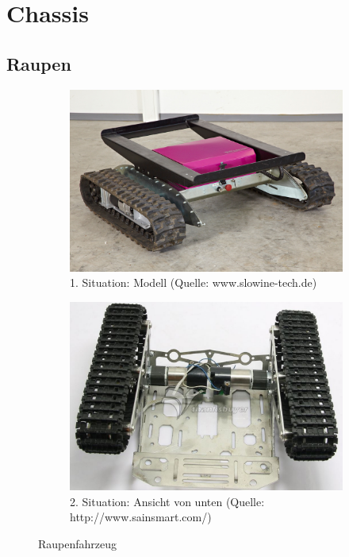 
\section{Chassis}


\subsection{Raupen}

\begin{figure} [hbp]
	\centering
	\begin{subfigure}[b]{0.4\textwidth}
		\includegraphics[width=\textwidth]{fig/Raupenfahrzeug.jpg}
		\caption{1. Situation: Modell 
		(Quelle: www.slowine-tech.de)}
	\end{subfigure}
	\hfill
	\begin{subfigure}[b]{0.36\textwidth}
		\includegraphics[width=\textwidth]{fig/Raupenfahrzeug-2.JPG}
		\caption{2. Situation: Ansicht von unten
		(Quelle: http://www.sainsmart.com/)}
\end{subfigure}
	\caption{Raupenfahrzeug}\label{fig:animals}
\end{figure}


